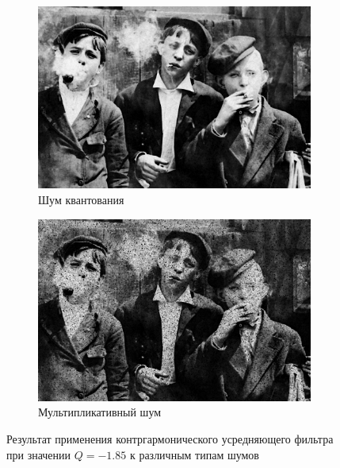 \begin{figure}[ht!]
\begin{subfigure}[b]{0.5\linewidth}
      \includegraphics[width=0.95\linewidth]{../Contraharmonic_Filter/Contraharmonic_Poisson_noise_(m,n=(3,_3),q=-1.85).jpg} 
      \caption{Шум квантования} 
      \label{contraharmonic_-1.85:e}
    \end{subfigure}%
    \begin{subfigure}[b]{0.5\linewidth}
        \centering
        \includegraphics[width=0.95\linewidth]{../Contraharmonic_Filter/Contraharmonic_Speckle_noise_(m,n=(3,_3),q=-1.85).jpg} 
        \caption{Мультипликативный шум} 
        \label{contraharmonic_-1.85:f} 
    \end{subfigure} 
    \caption{Результат применения контргармонического усредняющего фильтра при значении $Q = -1.85$ к различным типам шумов}
    \label{img:contraharmonic_-1.85} 
  \end{figure}

